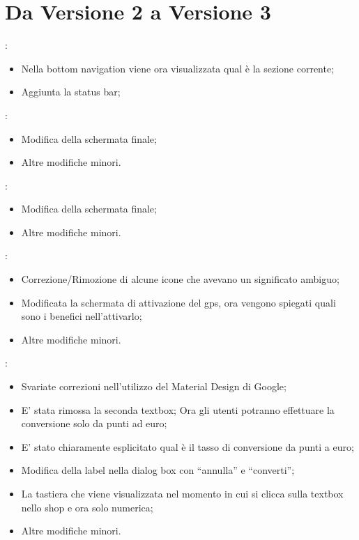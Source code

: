 \documentclass{article}
\begin{document}
\section{Da Versione 2 a Versione 3}
\begin{description}
\addtolength{\itemindent}{0.5cm}
\item [Generale] :
	\begin{itemize}
	\item Nella bottom navigation viene ora visualizzata qual è la sezione corrente;
	\item Aggiunta la status bar;
	\end{itemize}
\item [Quiz Giornaliero] :
	\begin{itemize}
	\item Modifica della schermata finale;
	\item Altre modifiche minori.
	\end{itemize}
\item [Quiz Settimanale] :
	\begin{itemize}
	\item Modifica della schermata finale;
	\item Altre modifiche minori.
	\end{itemize}
\item [Bacheca] :
    \begin{itemize}
	\item Correzione/Rimozione di alcune icone che avevano un significato ambiguo;
	\item Modificata la schermata di attivazione del gps, ora vengono spiegati quali sono i benefici nell’attivarlo;
	\item Altre modifiche minori.
	\end{itemize}
\item [Shop] :
    \begin{itemize}
	\item Svariate correzioni nell’utilizzo del Material Design di Google;
	\item E’ stata rimossa la seconda textbox; Ora gli utenti potranno effettuare la conversione solo da punti ad euro;
	\item E’ stato chiaramente esplicitato qual è il tasso di conversione da punti a euro;
	\item Modifica della label nella dialog box con “annulla” e “converti”;
	\item La tastiera che viene visualizzata nel momento in cui si clicca sulla textbox nello shop e ora solo numerica;
	\item Altre modifiche minori.
	\end{itemize}
	
\end{description}

        
\end{document}

